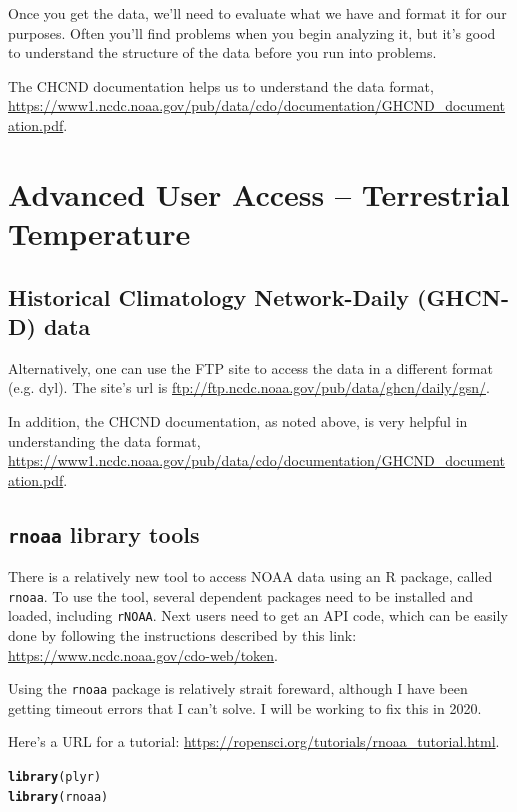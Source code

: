 \documentclass{article}\usepackage[]{graphicx}\usepackage[]{color}
\makeatletter
\newcommand{\hlstd}[1]{\textcolor[rgb]{0.345,0.345,0.345}{#1}}%
\newcommand{\hlkwd}[1]{\textcolor[rgb]{0.737,0.353,0.396}{\textbf{#1}}}%
\newenvironment{kframe}{%
 \def\at@end@of@kframe{}%
 \ifinner\ifhmode%
  \def\at@end@of@kframe{\end{minipage}}%
  \begin{minipage}{\columnwidth}%
 \fi\fi%
 \def\FrameCommand##1{\hskip\@totalleftmargin \hskip-\fboxsep
 \colorbox{shadecolor}{##1}\hskip-\fboxsep
     \hskip-\linewidth \hskip-\@totalleftmargin \hskip\columnwidth}%
 \MakeFramed {\advance\hsize-\width
   \@totalleftmargin\z@ \linewidth\hsize
   \@setminipage}}%
 {\par\unskip\endMakeFramed%
 \at@end@of@kframe}
\newenvironment{knitrout}{}{} %
\makeatother
\begin{document}
Once you get the data, we'll need to evaluate what we have and format it for our purposes. Often you'll find problems when you begin analyzing it, but it's good to understand the structure of the data before you run into problems. 

The CHCND documentation helps us to understand the data format, \url{https://www1.ncdc.noaa.gov/pub/data/cdo/documentation/GHCND_documentation.pdf}.

\section{Advanced User Access -- Terrestrial Temperature}  

\subsection{Historical Climatology Network-Daily (GHCN‐D) data}

Alternatively, one can use the FTP site to access the data in a different format (e.g. dyl). The site's url is \url{ftp://ftp.ncdc.noaa.gov/pub/data/ghcn/daily/gsn/}. 

In addition, the CHCND documentation, as noted above, is very helpful in understanding the data format, \url{https://www1.ncdc.noaa.gov/pub/data/cdo/documentation/GHCND_documentation.pdf}.

\subsection{\texttt{rnoaa} library tools}

There is a relatively new tool to access NOAA data using an R package, called \texttt{rnoaa}. To use the tool, several dependent packages need to be installed and loaded, including \texttt{rNOAA}. Next users need to get an API code, which can be easily done by following the instructions described by this link: \url{https://www.ncdc.noaa.gov/cdo-web/token}.

Using the \texttt{rnoaa} package is relatively strait foreward, although I have been getting timeout errors that I can't solve. I will be working to fix this in 2020. 

Here's a URL for a tutorial: \url{https://ropensci.org/tutorials/rnoaa_tutorial.html}.

\begin{knitrout}
\color{fgcolor}\begin{kframe}
\begin{alltt}
\hlkwd{library}\hlstd{(plyr)}
\hlkwd{library}\hlstd{(rnoaa)}
\end{alltt}
\end{kframe}
\end{knitrout}
\end{document}
